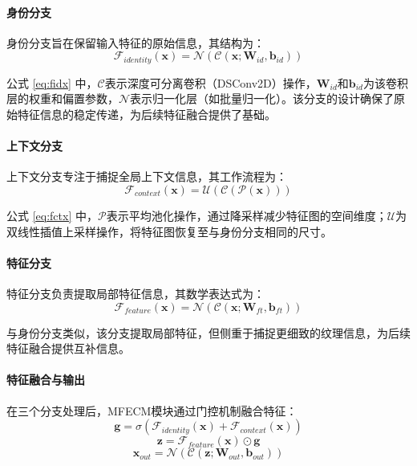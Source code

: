 \documentclass[runningheads]{llncs}
\begin{document}
\paragraph{身份分支}

身份分支旨在保留输入特征的原始信息，其结构为：
\begin{equation}\label{eq:fidx}
\mathcal{F}_{identity}(\mathbf{x}) = \mathcal{N} \left( \mathcal{C}( \mathbf{x}; \mathbf{W}_{id}, \mathbf{b}_{id} ) \right)
\end{equation}

公式 \ref{eq:fidx} 中，$\mathcal{C}$表示深度可分离卷积（DSConv2D）操作，$\mathbf{W}_{id}$和$\mathbf{b}_{id}$为该卷积层的权重和偏置参数，$\mathcal{N}$表示归一化层（如批量归一化）。该分支的设计确保了原始特征信息的稳定传递，为后续特征融合提供了基础。

\paragraph{上下文分支}

上下文分支专注于捕捉全局上下文信息，其工作流程为：
\begin{equation}\label{eq:fctx}
\mathcal{F}_{context}(\mathbf{x}) = \mathcal{U} \left( \mathcal{C} \left( \mathcal{P}(\mathbf{x}) \right ) \right )
\end{equation}

公式 \ref{eq:fctx} 中，$\mathcal{P}$表示平均池化操作，通过降采样减少特征图的空间维度；$\mathcal{U}$为双线性插值上采样操作，将特征图恢复至与身份分支相同的尺寸。

\paragraph{特征分支}

特征分支负责提取局部特征信息，其数学表达式为：
\begin{equation}\label{eq:ffex}
\mathcal{F}_{feature}(\mathbf{x}) = \mathcal{N} \left( \mathcal{C}( \mathbf{x}; \mathbf{W}_{ft}, \mathbf{b}_{ft} ) \right )
\end{equation}

与身份分支类似，该分支提取局部特征，但侧重于捕捉更细致的纹理信息，为后续特征融合提供互补信息。

\paragraph{特征融合与输出}

在三个分支处理后，MFECM模块通过门控机制融合特征：
\begin{equation}\label{eq:g}
\mathbf{g} = \sigma \left( \mathcal{F}_{identity}(\mathbf{x}) + \mathcal{F}_{context}(\mathbf{x}) \right )
\end{equation}
\begin{equation}\label{eq:z}
    \mathbf{z} = \mathcal{F}_{feature}(\mathbf{x}) \odot \mathbf{g}
\end{equation}
\begin{equation}\label{eq:xout2}
    \mathbf{x}_{out} = \mathcal{N} \left( \mathcal{C}( \mathbf{z}; \mathbf{W}_{out}, \mathbf{b}_{out} ) \right )
\end{equation}
\end{document}
